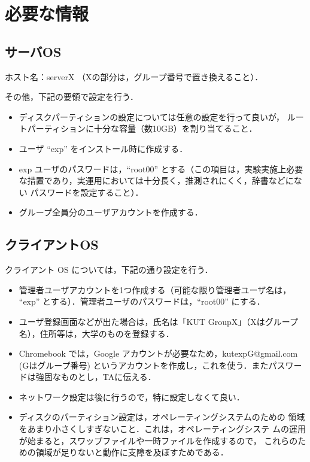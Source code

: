 \section{必要な情報}
\subsection{サーバOS}

ホスト名：serverX  （Xの部分は，グループ番号で置き換えること）．

その他，下記の要領で設定を行う．

\begin{itemize}
 \item ディスクパーティションの設定については任意の設定を行って良いが，
       ルートパーティションに十分な容量（数10GB）を割り当てること．
 \item ユーザ ``exp'' をインストール時に作成する．
 \item exp ユーザのパスワードは，``root00'' とする（この項目は，実験実施上必要
 な措置であり，実運用においては十分長く，推測されにくく，辞書などにない
       パスワードを設定すること）．
 \item グループ全員分のユーザアカウントを作成する．
\end{itemize}

\subsection{クライアントOS}
クライアント OS については，下記の通り設定を行う．

\begin{itemize}
 \item 管理者ユーザアカウントを1つ作成する（可能な限り管理者ユーザ名は，
       ``exp'' とする）．管理者ユーザのパスワードは，``root00'' にする．
 \item ユーザ登録画面などが出た場合は，氏名は「KUT GroupX」（Xはグループ
       名），住所等は，大学のものを登録する．
 \item Chromebook では，Google アカウントが必要なため，kutexpG@gmail.com (Gはグループ番号) というアカウントを作成し，これを使う．またパスワードは強固なものとし，TAに伝える．
 \item ネットワーク設定は後に行うので，特に設定しなくて良い．
 \item ディスクのパーティション設定は，オペレーティングシステムのための
       領域をあまり小さくしすぎないこと．これは，オペレーティングシステ
       ムの運用が始まると，スワップファイルや一時ファイルを作成するので，
       これらのための領域が足りないと動作に支障を及ぼすためである．
\end{itemize}

